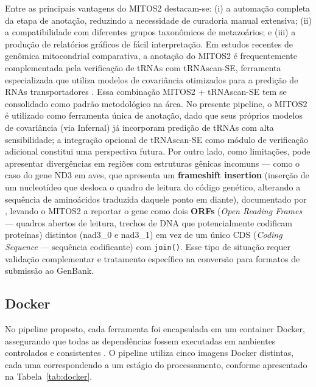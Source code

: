 Entre as principais vantagens do MITOS2 destacam-se: (i) a automação completa da etapa de anotação, reduzindo a necessidade de curadoria manual extensiva; (ii) a compatibilidade com diferentes grupos taxonômicos de metazoários; e (iii) a produção de relatórios gráficos de fácil interpretação. Em estudos recentes de genômica mitocondrial comparativa, a anotação do MITOS2 é frequentemente complementada pela verificação de tRNAs com tRNAscan-SE, ferramenta especializada que utiliza modelos de covariância otimizados para a predição de RNAs transportadores \cite{zhan2024,kundu2024,shi2024}. Essa combinação MITOS2 + tRNAscan-SE tem se consolidado como padrão metodológico na área. No presente pipeline, o MITOS2 é utilizado como ferramenta única de anotação, dado que seus próprios modelos de covariância (via Infernal) já incorporam predição de tRNAs com alta sensibilidade; a integração opcional de tRNAscan-SE como módulo de verificação adicional constitui uma perspectiva futura. Por outro lado, como limitações, pode apresentar divergências em regiões com estruturas gênicas incomuns --- como o caso do gene ND3 em aves, que apresenta um \textbf{frameshift insertion} (inserção de um nucleotídeo que desloca o quadro de leitura do código genético, alterando a sequência de aminoácidos traduzida daquele ponto em diante), documentado por , levando o MITOS2 a reportar o gene como dois \textbf{ORFs} (\textit{Open Reading Frames} --- quadros abertos de leitura, trechos de DNA que potencialmente codificam proteínas) distintos (nad3\_0 e nad3\_1) em vez de um único CDS (\textit{Coding Sequence} --- sequência codificante) com \texttt{join()}. Esse tipo de situação requer validação complementar e tratamento específico na conversão para formatos de submissão ao GenBank.

\subsection{Docker}

No pipeline proposto, cada ferramenta foi encapsulada em um container Docker, assegurando que todas as dependências fossem executadas em ambientes controlados e consistentes \cite{merkel2014}. O pipeline utiliza cinco imagens Docker distintas, cada uma correspondendo a um estágio do processamento, conforme apresentado na Tabela~\ref{tab:docker}.

